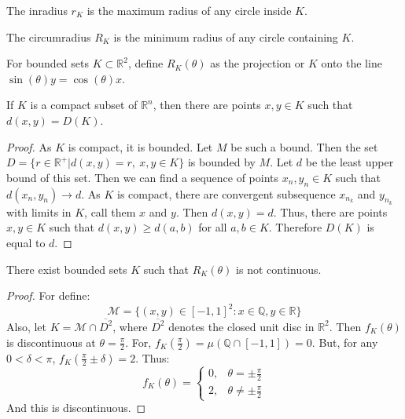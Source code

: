 \documentclass[crop=false,class=book,oneside]{standalone}
\begin{document}
            \begin{definition}
            The inradius $r_K$ is the maximum radius of any circle inside $K$.
            \end{definition}
            \begin{definition}
            The circumradius $R_K$ is the minimum radius of any circle containing $K$.
            \end{definition}
            \begin{notation}
            For bounded sets $K\subset \mathbb{R}^2$, define $R_K(\theta)$ as the projection or $K$ onto the line $\sin(\theta)y=\cos(\theta)x$.
            \end{notation}
            \begin{theorem}
            If $K$ is a compact subset of $\mathbb{R}^n$, then there are points $x,y\in K$ such that $d(x,y)=D(K)$.
            \end{theorem}
            \begin{proof}
            As $K$ is compact, it is bounded. Let $M$ be such a bound. Then the set $D=\{r\in \mathbb{R}^+| d(x,y) = r,\ x,y\in K\}$ is bounded by $M$. Let $d$ be the least upper bound of this set. Then we can find a sequence of points $x_n,y_n\in K$ such that $d(x_n,y_n) \rightarrow d$. As $K$ is compact, there are convergent subsequence $x_{n_k}$ and $y_{n_k}$ with limits in $K$, call them $x$ and $y$. Then $d(x,y) = d$. Thus, there are points $x,y\in K$ such that $d(x,y) \geq d(a,b)$ for all $a,b\in K$. Therefore $D(K)$ is equal to $d$.
            \end{proof}
            \begin{theorem}
                \label{thm:Convex_Geo_Bounded_Set_Discon_Angle_Proj_Func}
                There exist bounded sets $K$ such that $R_K(\theta)$
                is not continuous.
            \end{theorem}
            \begin{proof}
                For define:
                \begin{equation}
                    \mathcal{M}=
                        \{(x,y)\in [-1,1]^2:
                            x\in\mathbb{Q},y\in \mathbb{R}\}
                \end{equation}
                Also, let $K=\mathcal{M}\cap\overline{D^{2}}$,
                where $\overline{D^{2}}$ denotes the closed unit
                disc in $\mathbb{R}^{2}$. Then $f_{K}(\theta)$ is
                discontinuous at $\theta=\frac{\pi}{2}$. For,
                $f_K(\frac{\pi}{2})=\mu(\mathbb{Q}\cap [-1,1])=0$. But,
                for any $0<\delta<\pi$,
                $f_K(\frac{\pi}{2}\pm\delta)=2$. Thus:
                \begin{equation}
                    f_K(\theta)=
                        \begin{cases}
                            0,&\theta=\pm\frac{\pi}{2}\\
                            2,&\theta\ne\pm\frac{\pi}{2}
                        \end{cases}
                \end{equation}
                And this is discontinuous.
            \end{proof}
\end{document}

